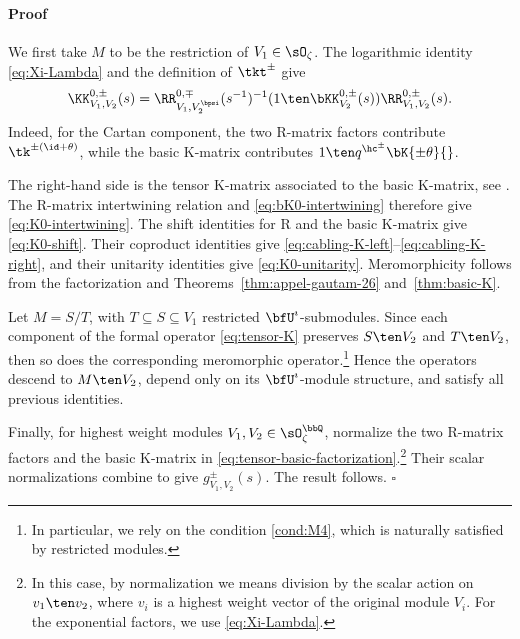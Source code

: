 \documentclass[reqno]{amsart}
\numberwithin{equation}{section}
\newenvironment{pf}{\medskip\paragraph{{\sc Proof}}}{\hfill$\square$\par\medskip}
\begin{document}
\begin{pf}
We first take $M$ to be the restriction of $V_1\in\sO_\zeta$.
The logarithmic identity \eqref{eq:Xi-Lambda} and the definition of
$\tkt^\pm$ give
\begin{equation}\label{eq:tensor-basic-factorization}
\KK^{0,\pm}_{V_1,V_2}(s)
=\RR^{0,\mp}_{V_1,V_2^{\bpsi}}(s^{-1})^{-1}
(1\ten\bKK^{0,\pm}_{V_2}(s))
\RR^{0,\pm}_{V_1,V_2}(s).
\end{equation}
Indeed, for the Cartan component, the two R-matrix factors contribute
$\tk^{\pm(\id+\theta)}$, while the basic K-matrix contributes
$1\ten q^{\hc^\pm}\bK{\pm\theta}{}$.

The right-hand side is the tensor K-matrix associated to the basic
K-matrix, see \cite{kolb-20,appel-vlaar-25b}. The R-matrix
intertwining relation and \eqref{eq:bK0-intertwining} therefore give
\eqref{eq:K0-intertwining}. The shift identities for R and the basic
K-matrix give \eqref{eq:K0-shift}. Their coproduct identities give
\eqref{eq:cabling-K-left}--\eqref{eq:cabling-K-right}, and their
unitarity identities give \eqref{eq:K0-unitarity}. Meromorphicity follows
from the factorization and Theorems~\ref{thm:appel-gautam-26}
and~\ref{thm:basic-K}.

Let $M=S/T$, with $T\subseteq S\subseteq V_1$ restricted $\bfU^\imath$-submodules. Since each component of the formal operator \eqref{eq:tensor-K} preserves $S\ten V_2$ and $T\ten V_2$, then so does the corresponding meromorphic operator.\footnote{
In particular, we rely on the condition \ref{cond:M4}, which is naturally satisfied by restricted modules.} 
Hence the operators descend to $M\ten V_2$, depend only on its $\bfU^\imath$-module structure, and satisfy all previous identities.

Finally, for highest weight modules $V_1,V_2\in\sO_\zeta^{\bbQ}$, normalize
the two R-matrix factors and the basic K-matrix in
\eqref{eq:tensor-basic-factorization}.\footnote{In this case, by normalization we means division by the scalar action on $v_1\ten v_2$, where $v_i$ is a highest weight vector of the original
module $V_i$. For the exponential factors, we use
\eqref{eq:Xi-Lambda}.} Their scalar normalizations
combine to give $g^\pm_{V_1,V_2}(s)$. The result follows.
\end{pf}
\end{document}
